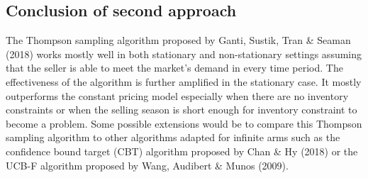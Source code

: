 \documentclass[a4paper]{article}
\begin{document}
\subsection{Conclusion of second approach}
The Thompson sampling algorithm proposed by Ganti, Sustik, Tran \& Seaman (2018) works mostly well in both stationary and non-stationary settings assuming that the seller is able to meet the market's demand in every time period. The effectiveness of the algorithm is further amplified in the stationary case. It mostly outperforms the constant pricing model especially when there are no inventory constraints or when the selling season is short enough for inventory constraint to become a problem. Some possible extensions would be to compare this Thompson sampling algorithm to other algorithms adapted for infinite arms such as the confidence bound target (CBT) algorithm proposed by Chan \& Hy (2018)  or the UCB-F algorithm proposed by Wang, Audibert \& Munos (2009).

\end{document}
